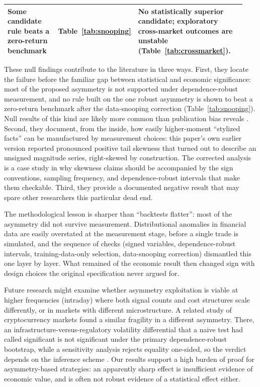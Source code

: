 \documentclass[11pt]{article}
\begin{document}
\begin{table}[H]
\begin{tabular}{@{}>{\raggedright\arraybackslash}p{0.25\linewidth}>{\raggedright\arraybackslash}p{0.17\linewidth}>{\raggedright\arraybackslash}p{0.52\linewidth}@{}}
Some candidate rule beats a zero-return benchmark & Table~\ref{tab:snooping} & No statistically superior candidate; exploratory cross-market outcomes are unstable (Table~\ref{tab:crossmarket}). \\
\bottomrule
\end{tabular}
\end{table}

These null findings contribute to the literature in three ways. First, they locate the failure before the familiar gap between statistical and economic significance: most of the proposed asymmetry is not supported under dependence-robust measurement, and no rule built on the one robust asymmetry is shown to beat a zero-return benchmark after the data-snooping correction (Table~\ref{tab:snooping}). Null results of this kind are likely more common than publication bias reveals \citep{harvey2017presidential}. Second, they document, from the inside, how easily higher-moment ``stylized facts'' can be manufactured by measurement choices: this paper's own earlier version reported pronounced positive tail skewness that turned out to describe an unsigned magnitude series, right-skewed by construction. The corrected analysis is a case study in why skewness claims should be accompanied by the sign conventions, sampling frequency, and dependence-robust intervals that make them checkable. Third, they provide a documented negative result that may spare other researchers this particular dead end.

The methodological lesson is sharper than ``backtests flatter'': most of the asymmetry did not survive measurement. Distributional anomalies in financial data are easily overstated at the measurement stage, before a single trade is simulated, and the sequence of checks (signed variables, dependence-robust intervals, training-data-only selection, data-snooping correction) dismantled this one layer by layer. What remained of the economic result then changed sign with design choices the original specification never argued for.

Future research might examine whether asymmetry exploitation is viable at higher frequencies (intraday) where both signal counts and cost structures scale differently, or in markets with different microstructure. A related study of cryptocurrency markets found a similar fragility in a different asymmetry. There, an infrastructure-versus-regulatory volatility differential that a naive test had called significant is not significant under the primary dependence-robust bootstrap, while a sensitivity analysis rejects equality one-sided, so the verdict depends on the inference scheme \citep{farzulla2026multimoment}. Our results support a high burden of proof for asymmetry-based strategies: an apparently sharp effect is insufficient evidence of economic value, and is often not robust evidence of a statistical effect either.
\end{document}
